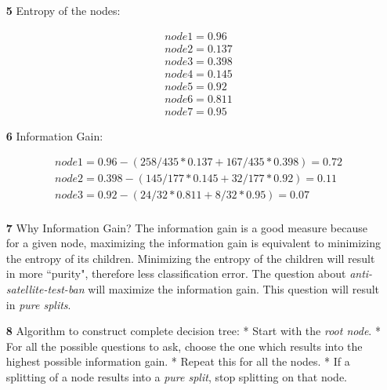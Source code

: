 \documentclass[a4paper]{article}
\begin{document}
\begin{enumerate}
	\item[ \textbf{5} ] Entropy of the nodes:
		\begin{tcolorbox}
		\begin{align*}
			& node1 = 0.96  \\
			& node2 = 0.137  \\
			& node3 = 0.398  \\
			& node4 = 0.145  \\
			& node5 = 0.92  \\
			& node6 = 0.811  \\
			& node7 = 0.95
		\end{align*}
	\end{tcolorbox}
	
	\item[ \textbf{6} ] Information Gain:
	    \begin{tcolorbox}
	    \begin{align*}
		  & node1 = 0.96 - (258/435 * 0.137 + 167/435 * 0.398)
		          = 0.72  \\ 
		  & node2 = 0.398 - (145/177 * 0.145 + 32/177 * 0.92)
		          = 0.11  \\
		  & node3 = 0.92 - (24/32 * 0.811 + 8/32 * 0.95)
		          = 0.07  \\
	    \end{align*}
	    \end{tcolorbox}
	
	\item[ \textbf{7} ] Why Information Gain? \newline
	The information gain is a good measure because for a given node, maximizing the information gain is equivalent to minimizing the entropy of its children. Minimizing the entropy of the children will result in more ``purity", therefore less classification error. \newline \newline
	The question about \textit{anti-satellite-test-ban} will maximize the information gain. This question will result in \textit{pure splits}.
	
	\item[ \textbf{8} ] Algorithm to construct complete decision tree: \newline
	* Start with the \textit{root node}. \newline
	* For all the possible questions to ask, choose the one which results into the highest possible information gain. \newline
	* Repeat this for all the nodes. \newline
	* If a splitting of a node results into a \textit{pure split}, stop splitting on that node.
	
\end{enumerate}
\end{document}
